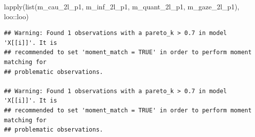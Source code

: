 \documentclass[
]{article}
\newenvironment{Shaded}{\begin{snugshade}}{\end{snugshade}}
\newcommand{\FunctionTok}[1]{\textcolor[rgb]{0.00,0.00,0.00}{#1}}
\newcommand{\NormalTok}[1]{#1}
\newcommand{\SpecialCharTok}[1]{\textcolor[rgb]{0.00,0.00,0.00}{#1}}
\begin{document}
\begin{Shaded}
\begin{Highlighting}[]
\FunctionTok{lapply}\NormalTok{(}\FunctionTok{list}\NormalTok{(m\_cau\_2l\_p1, m\_inf\_2l\_p1, m\_quant\_2l\_p1, m\_gaze\_2l\_p1), loo}\SpecialCharTok{::}\NormalTok{loo)}
\end{Highlighting}
\end{Shaded}

\begin{verbatim}
## Warning: Found 1 observations with a pareto_k > 0.7 in model 'X[[i]]'. It is
## recommended to set 'moment_match = TRUE' in order to perform moment matching for
## problematic observations.

## Warning: Found 1 observations with a pareto_k > 0.7 in model 'X[[i]]'. It is
## recommended to set 'moment_match = TRUE' in order to perform moment matching for
## problematic observations.
\end{verbatim}
\end{document}
